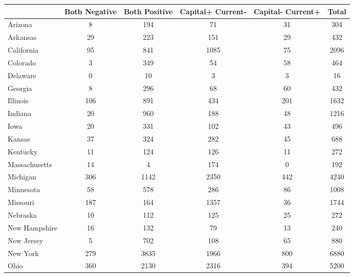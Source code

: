 
\begin{tabular}{l*{5}{c}}
\toprule
            &Both Negative&Both Positive&Capital+ Current-&Capital- Current+&       Total\\
\midrule
Arizona     &           8&         194&          71&          31&         304\\
Arkansas    &          29&         223&         151&          29&         432\\
California  &          95&         841&        1085&          75&        2096\\
Colorado    &           3&         349&          54&          58&         464\\
Delaware    &           0&          10&           3&           3&          16\\
Georgia     &           8&         296&          68&          60&         432\\
Illinois    &         106&         891&         434&         201&        1632\\
Indiana     &          20&         960&         188&          48&        1216\\
Iowa        &          20&         331&         102&          43&         496\\
Kansas      &          37&         324&         282&          45&         688\\
Kentucky    &          11&         124&         126&          11&         272\\
Massachusetts&          14&           4&         174&           0&         192\\
Michigan    &         306&        1142&        2350&         442&        4240\\
Minnesota   &          58&         578&         286&          86&        1008\\
Missouri    &         187&         164&        1357&          36&        1744\\
Nebraska    &          10&         112&         125&          25&         272\\
New Hampshire&          16&         132&          79&          13&         240\\
New Jersey  &           5&         702&         108&          65&         880\\
New York    &         279&        3835&        1966&         800&        6880\\
Ohio        &         360&        2130&        2316&         394&        5200\\

\end{tabular}
